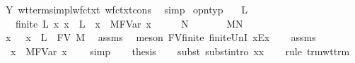 \begin{isabellebody}
\ Y\ wt{\isacharunderscore}terms{\isacharunderscore}impl{\isacharunderscore}wf{\isacharunderscore}ctxt\ wf{\isacharunderscore}ctxt{\isacharunderscore}cons\ \isamarkupfalse%
\ simp\isanewline
{}\isamarkupfalse%
%
\endisatagproof
{\isafoldproof}%
%
\isadelimproof
\isanewline
%
\endisadelimproof
\isanewline
{}\isamarkupfalse%
\ opn{\isacharunderscore}typ{\isacharcolon}\isanewline
\ \ \ L\isanewline
\ \ \ {\isachardoublequoteopen}finite\ L{\isachardoublequoteclose}\ {\isachardoublequoteopen}{\isasymAnd}x{\isachardot}\ x\ {\isasymnotin}\ L\ {\isasymLongrightarrow}\ {\isacharparenleft}{\isacharparenleft}x{\isacharcomma}{\isasymtau}{\isacharparenright}{\isacharhash}{\isasymGamma}{\isacharparenright}\ {\isasymturnstile}\ M{\isacharcircum}FVar\ x\ {\isacharcolon}\ {\isasymsigma}{\isachardoublequoteclose}\ \ {\isachardoublequoteopen}{\isasymGamma}\ {\isasymturnstile}\ N\ {\isacharcolon}\ {\isasymtau}{\isachardoublequoteclose}\isanewline
\ \ \ {\isachardoublequoteopen}{\isasymGamma}\ {\isasymturnstile}\ M{\isacharcircum}N\ {\isacharcolon}\ {\isasymsigma}{\isachardoublequoteclose}\isanewline
%
\isadelimproof
%
\endisadelimproof
%
\isatagproof
{}\isamarkupfalse%
\ {\isacharminus}\isanewline
\ \ \isamarkupfalse%
\ x\ \ {}{\isacharcolon}\ {\isachardoublequoteopen}x\ {\isasymnotin}\ L\ {\isasymunion}\ FV\ M{\isachardoublequoteclose}\ \isamarkupfalse%
\ assms\ \isamarkupfalse%
\ {\isacharparenleft}meson\ FV{\isacharunderscore}finite\ finite{\isacharunderscore}UnI\ x{\isacharunderscore}Ex{\isacharparenright}\isanewline
\ \ \isamarkupfalse%
\ assms\ \isamarkupfalse%
\ {}{\isacharcolon}\ {\isachardoublequoteopen}{\isacharparenleft}{\isacharparenleft}x{\isacharcomma}{\isasymtau}{\isacharparenright}{\isacharhash}{\isasymGamma}{\isacharparenright}\ {\isasymturnstile}\ M{\isacharcircum}FVar\ x\ {\isacharcolon}\ {\isasymsigma}{\isachardoublequoteclose}\ \isamarkupfalse%
\ simp\isanewline
\isanewline
\ \ \isamarkupfalse%
\ {\isacharquery}thesis\isanewline
\ \ \isamarkupfalse%
\ {\isacharparenleft}subst\ subst{\isacharunderscore}intro{}{\isacharbrackleft}\ x{\isacharequal}x{\isacharbrackright}{\isacharparenright}\isanewline
\ \ \isamarkupfalse%
\ {\isacharparenleft}rule\ trm{\isacharunderscore}wt{\isacharunderscore}trm{\isacharparenright}\isanewline

\end{isabellebody}
